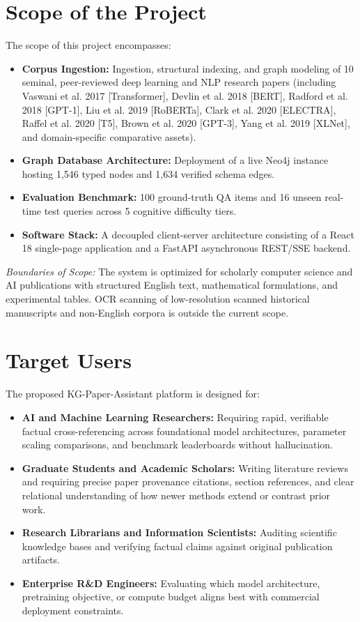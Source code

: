 \documentclass[12pt,a4paper,oneside]{report}
\begin{document}
\section{Scope of the Project}
The scope of this project encompasses:
\begin{itemize}
    \item \textbf{Corpus Ingestion:} Ingestion, structural indexing, and graph modeling of 10 seminal, peer-reviewed deep learning and NLP research papers (including Vaswani et al. 2017 [Transformer], Devlin et al. 2018 [BERT], Radford et al. 2018 [GPT-1], Liu et al. 2019 [RoBERTa], Clark et al. 2020 [ELECTRA], Raffel et al. 2020 [T5], Brown et al. 2020 [GPT-3], Yang et al. 2019 [XLNet], and domain-specific comparative assets).
    \item \textbf{Graph Database Architecture:} Deployment of a live Neo4j instance hosting 1,546 typed nodes and 1,634 verified schema edges.
    \item \textbf{Evaluation Benchmark:} 100 ground-truth QA items and 16 unseen real-time test queries across 5 cognitive difficulty tiers.
    \item \textbf{Software Stack:} A decoupled client-server architecture consisting of a React 18 single-page application and a FastAPI asynchronous REST/SSE backend.
\end{itemize}

\textit{Boundaries of Scope:} The system is optimized for scholarly computer science and AI publications with structured English text, mathematical formulations, and experimental tables. OCR scanning of low-resolution scanned historical manuscripts and non-English corpora is outside the current scope.

\section{Target Users}
The proposed KG-Paper-Assistant platform is designed for:
\begin{itemize}
    \item \textbf{AI and Machine Learning Researchers:} Requiring rapid, verifiable factual cross-referencing across foundational model architectures, parameter scaling comparisons, and benchmark leaderboards without hallucination.
    \item \textbf{Graduate Students and Academic Scholars:} Writing literature reviews and requiring precise paper provenance citations, section references, and clear relational understanding of how newer methods extend or contrast prior work.
    \item \textbf{Research Librarians and Information Scientists:} Auditing scientific knowledge bases and verifying factual claims against original publication artifacts.
    \item \textbf{Enterprise R\&D Engineers:} Evaluating which model architecture, pretraining objective, or compute budget aligns best with commercial deployment constraints.
\end{itemize}
\end{document}

